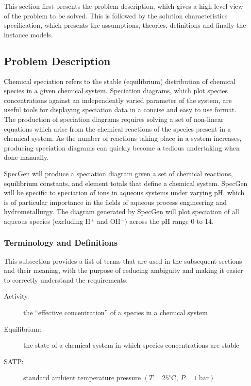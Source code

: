 \documentclass[12pt]{article}
\newcommand{\progname}{SpecGen} %
\begin{document}
This section first presents the problem description, which gives a high-level
view of the problem to be solved.  This is followed by the solution characteristics
specification, which presents the assumptions, theories, definitions and finally
the instance models.

\subsection{Problem Description} \label{Sec_pd}
Chemical speciation refers to the stable (equilibrium) distribution of chemical species in a given chemical system.   Speciation diagrams, which plot species concentrations against an independently varied parameter of the system, are useful tools for displaying speciation data in a concise and easy to use format.  The production of speciation diagrams requires solving a set of non-linear equations which arise from the chemical reactions of the species present in a chemical system.  As the number of reactions taking place in a system increases, producing speciation diagrams can quickly become a tedious undertaking when done manually.

\progname{} will produce a speciation diagram given a set of chemical reactions, equilibrium constants, and element totals that define a chemical system.  \progname{} will be specific to speciation of ions in aqueous systems under varying pH, which is of particular importance in the fields of aqueous process engineering and hydrometallurgy.  The diagram generated by \progname{} will plot speciation of all aqueous species (excluding H$^+$ and OH$^-$) across the pH range 0 to 14.

\subsubsection{Terminology and Definitions}

This subsection provides a list of terms that are used in the subsequent
sections and their meaning, with the purpose of reducing ambiguity and making it
easier to correctly understand the requirements:

\begin{description}
\item[Activity:] the ``effective concentration'' of a species in a chemical system
\item[Equilibrium:] the state of a chemical system in which species concentrations are stable
\item[SATP:] standard ambient temperature pressure $(T = 25^{\circ}\textrm{C}, ~P = 1~\textrm{bar})$
\end{description}
\end{document}
